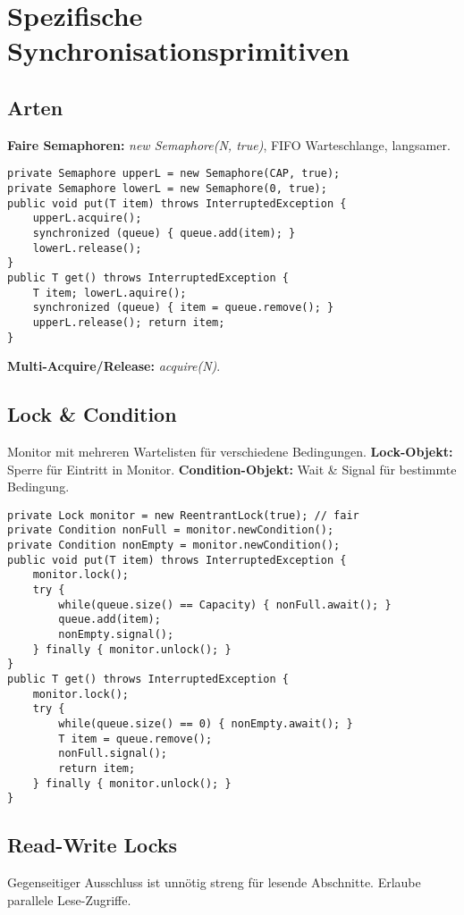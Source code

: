 \section{Spezifische Synchronisationsprimitiven}
\subsection{Arten}
\textbf{Faire Semaphoren:} \textit{new Semaphore(N, true)}, FIFO Warteschlange, langsamer.

\begin{lstlisting}
private Semaphore upperL = new Semaphore(CAP, true);
private Semaphore lowerL = new Semaphore(0, true);
public void put(T item) throws InterruptedException {
    upperL.acquire();
    synchronized (queue) { queue.add(item); }
    lowerL.release();
}
public T get() throws InterruptedException {
    T item; lowerL.aquire();
    synchronized (queue) { item = queue.remove(); }
    upperL.release(); return item;
}
\end{lstlisting}
\textbf{Multi-Acquire/Release:} \textit{acquire(N)}.

\subsection{Lock \& Condition}
Monitor mit mehreren Wartelisten für verschiedene Bedingungen.
\textbf{Lock-Objekt:} Sperre für Eintritt in Monitor.
\textbf{Condition-Objekt:} Wait \& Signal für bestimmte Bedingung.

\begin{lstlisting}
private Lock monitor = new ReentrantLock(true); // fair
private Condition nonFull = monitor.newCondition();
private Condition nonEmpty = monitor.newCondition();
public void put(T item) throws InterruptedException {
    monitor.lock();
    try {
        while(queue.size() == Capacity) { nonFull.await(); }
        queue.add(item);
        nonEmpty.signal();
    } finally { monitor.unlock(); }
}
public T get() throws InterruptedException {
    monitor.lock();
    try {
        while(queue.size() == 0) { nonEmpty.await(); }
        T item = queue.remove();
        nonFull.signal();
        return item;
    } finally { monitor.unlock(); }
}
\end{lstlisting}

\subsection{Read-Write Locks}
Gegenseitiger Ausschluss ist unnötig streng für lesende Abschnitte.
Erlaube parallele Lese-Zugriffe.

